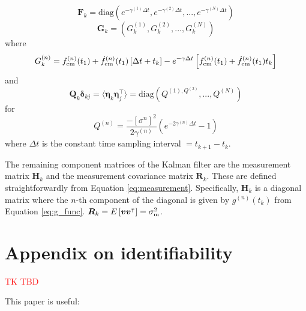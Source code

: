 \documentclass[fleqn,usenatbib,useAMS]{mnras}
\begin{document}
\begin{equation}
	\boldsymbol{F}_k = 	\text{diag}\left(e^{- \gamma^{(1)} \Delta t},e^{- \gamma^{(2)} \Delta t},...,e^{- \gamma^{(N)} \Delta t} \right)
\end{equation}
\begin{equation}
\boldsymbol{G}_k	= \left(G^{(1)}_k, G^{(2)}_k,...,G^{(N)}_k \right)
\end{equation}
where
\begin{equation}
	G_k^{(n)} =    f^{(n)}_{\rm em}(t_1) + \dot{f}^{(n)}_{\rm em}(t_1)  \left[\Delta t + t_k \right] - e^{-\gamma \Delta t} \left[  f^{(n)}_{\rm em}(t_1) +\dot{f}^{(n)}_{\rm em}(t_1)  t_k \right]
\end{equation}
and
\begin{equation}
	\boldsymbol{Q}_k \boldsymbol{\delta}_{kj}= \langle \boldsymbol{\eta}_k \boldsymbol{\eta}_j^\intercal \rangle = \text{diag} \left(Q^{(1), Q^{(2)}},...,Q^{(N)}\right) 
\end{equation}
for 
\begin{equation}
	Q^{(n)} = \frac{- [\sigma^{n}]^2}{2 \gamma^{(n)}} \left( e^{-2 \gamma^{(n)} \Delta t} -1\right)
\end{equation}
where $\Delta t$ is the constant time sampling interval $=t_{k+1} -t_{k}$. \newline 


The remaining component matrices of the Kalman filter are the measurement matrix $\boldsymbol{H}_k$ and the measurement covariance matrix $\boldsymbol{R}_k$. These are defined straightforwardly from Equation \ref{eq:measurement}. Specifically, 
$\boldsymbol{H}_k$ is a diagonal matrix where the $n$-th component of the diagonal is given by $g^{(n)}(t_k)$ from Equation \ref{eq:g_func}. $\boldsymbol{R}_k = E \left[ \boldsymbol{v} \boldsymbol{v}^\intercal \right] = \sigma^2_{\rm m}$.













\section{Appendix on identifiability}\label{appendix_identifiability}


\textcolor{red}{TK TBD}



This paper is useful: \citep{KARLSSON2012941} \citep{SEDOGLAVIC2002735}
\end{document}
